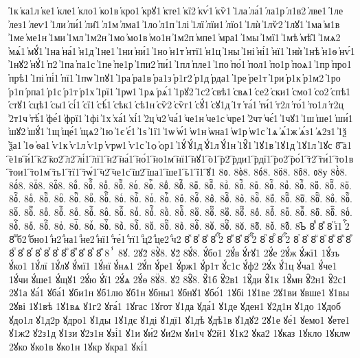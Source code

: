 {҆1к
҆ка1л
҆ке1
҆кле1
҆кло1
҆ко1в
҆кро1
҆крꙋ1
҆кте1
҆кї2
҆кѵ́1
҆кѷ1
҆1ла
҆ла́1
҆ла1р
҆л1в2
҆лве1
҆1ле
҆лез1
҆леѵ1
҆1ли
҆ли́1
҆ли̑1
҆л1м
҆лма1
҆1ло
҆л1п
҆1лі
҆1лї
҆лїи1
҆лїо1
҆1лѝ
҆1лѷ2
҆1лꙋ1
҆1ма
҆м1в
҆1ме
҆ме1н
҆1ми
҆1мл
҆1м2н
҆1мо
҆мо1в
҆мо1н
҆1м2п
҆мпе1
҆мра1
҆1мы
҆1мї1
҆1мѣ
҆мѣ̑1
҆1мѧ2
҆мѧ́1
҆мꙋ́1
҆1на
҆на́1
҆н1д
҆1не1
҆1ни
҆ни́1
҆1но
҆н1т
҆нтї1
҆н1ц
҆1ны
҆1ні
҆ні́1
҆нї1
҆1нѝ
҆1нѣ
҆н1ѳ
҆нѵ́1
҆1нꙋ2
҆нꙋ́1
҆п2
҆1па
҆па1с
҆1пе
҆пе1р
҆1пи2
҆пи́1
҆1пл
҆пле1
҆1по
҆по́1
҆пол1
҆по1р
҆поѧ1
҆1пр
҆про1
҆прѣ1
҆1пі
҆пі́1
҆пї1
҆1пѡ
҆1пꙋ1
҆1ра
҆ра1в
҆ра1з
҆р1г2
҆р1д
҆рда1
҆1ре
҆ре1т
҆1ри
҆р1к
҆р1м2
҆1ро
҆р1п
҆рпа1
҆р1с
҆р1т
҆р1х
҆1рї1
҆1рѡ1
҆1рѧ
҆рѧ́1
҆1рꙋ2
҆1с2
҆свѣ1
҆свѧ1
҆се2
҆ски1
҆смо1
҆со2
҆спѣ1
҆стꙋ1
҆сцѣ1
҆сы1
҆сі́1
҆сї1
҆сѣ́1
҆сѣк1
҆сѣ1н
҆сѷ2
҆сѷг1
҆сꙋ́1
҆сꙋ1д
҆1т
҆та́1
҆ти́1
҆т2л
҆то́1
҆то1л
҆т2ц
҆2т1ч
҆тѣ́1
҆фе́1
҆фрї1
҆1фі
҆1х
҆ха́1
҆хі́1
҆2ц
҆ч2
҆ча́1
҆че1н
҆че1с
҆чре1
҆2чт
҆чє́1
҆1чꙋ1
҆1ш
҆ше1
҆ши́1
҆шꙋ2
҆шꙋ́1
҆1щ
҆ще́1
҆щѧ2
҆1ю
҆1є
҆є́1
҆1ѕ
҆1ї1
҆1ѡ
҆ѡ́1
҆ѡ1н
҆ѡна1
҆ѡ1р
҆ѡ1с
҆1ѧ
҆ѧ́1ж
҆ѧ́з1
҆ѧ2з1
҆1ѯ
҆ѯа1
҆1ѳ
҆ѳа1
҆ѵ1к
҆ѵ1л
҆ѵ1р
҆ѵрѡ1
҆ѵ1с
҆1ѻ
҆ѻр1
҆1ꙋ́
҆ꙋ́1д
҆ꙋ́1л
҆ꙋ́1н
҆1ꙋ̑1
҆1ꙋ1в
҆1ꙋ1д
҆1ꙋ1л
҆1ꙋс
8҇
҇а1
҇е1в
҇и́1
҇к2
҇ко2
҇л2
҇лі́1
҇лї1
҇н2
҇на́1
҇но́1
҇но1м
҇нї1
҇нꙋ1
҇о1
҇р2
҇рди1
҇рдї1
҇ро2
҇ро́1
҇т2
҇ти́1
҇то1в
҇тои1
҇то1м
҇ть1
҇тї1
҇тѡ́1
҇ч2
҇че1с
҇ш2
҇ша1
҇ше1
҇ь1
҇ї1
҇ꙋ1
8ᲂ.
8ᲂ̀8.
8ᲂ́8.
8ᲂ̈8.
8ᲂ̑8.
ᲂ8у  
8ᲂ҆̀8.
8ᲂ҆́8.
8ᲂ҆̈8.
8ᲂ҆̑8.
8ᲂⷠ.
8ᲂⷠ҇.
8ᲂⷡ.
8ᲂⷡ҇.
8ᲂⷢ.
8ᲂⷢ҇.
8ᲂⷣ.
8ᲂⷣ҇.
8ᲂⷤ.
8ᲂⷤ҇.
8ᲂⷥ.
8ᲂⷥ҇.
8ᲂⷦ.
8ᲂⷦ҇.
8ᲂⷧ.
8ᲂⷧ҇.
8ᲂⷨ.
8ᲂⷨ҇.
8ᲂⷩ.
8ᲂⷩ҇.
8ᲂⷪ.
8ᲂⷪ҇.
8ᲂⷫ.
8ᲂⷫ҇.
8ᲂⷬ.
8ᲂⷬ҇.
8ᲂⷭ.
8ᲂⷭ҇.
8ᲂⷮ.
8ᲂⷮ҇.
8ᲂⷯ.
8ᲂⷯ҇.
8ᲂⷰ.
8ᲂⷰ҇.
8ᲂⷱ.
8ᲂⷱ҇.
8ᲂⷲ.
8ᲂⷲ҇.
8ᲂⷳ.
8ᲂⷳ҇.
8ᲂⷴ.
8ᲂⷴ҇.
8ᲂⷵ.
8ᲂⷵ҇.
8ᲂⷶ.
8ᲂⷶ҇.
8ᲂⷷ.
8ᲂⷷ҇.
8ᲂⷸ.
8ᲂⷸ҇.
8ᲂⷹ.
8ᲂⷹ҇.
8ᲂⷺ.
8ᲂⷺ҇.
8ᲂⷻ.
8ᲂⷻ҇.
8ᲂⷼ.
8ᲂⷼ҇.
8ᲂⷽ.
8ᲂⷽ҇.
8ᲂⷾ.
8ᲂⷾ҇.
8ᲂⷿ.
8ᲂⷿ҇.
8ᲂꙴ.
8ᲂꙴ҇.
8ᲂꙵ.
8ᲂꙵ҇.
8ᲂꙶ.
8ᲂꙶ҇.
8ᲂꙷ.
8ᲂꙷ҇.
8ᲂꙸ.
8ᲂꙸ҇.
8ᲂꙹ.
8ᲂꙹ҇.
8ᲂꙺ.
8ᲂꙺ҇.
8ᲂꙻ.
8ᲂꙻ҇.
8ᲂ꙼.
8ᲂ꙼҇.
8ᲂ꙽.
8ᲂ꙽҇.
8ᲆ
8ⷠ
8ⷡ
8ⷢ
ⷢї1
ⷢ҇2
8ⷣ
ⷣб2
ⷣбно1
ⷣн2
ⷣна1
ⷣне2
ⷣнї1
ⷣте́1
ⷣтї1
ⷣц2
ⷣце2
ⷣч2
8ⷤ
8ⷥ
8ⷦ
8ⷧ
ⷧ҇2
8ⷨ
8ⷩ
8ⷪ
ⷪ҇2
8ⷫ
8ⷬ
8ⷭ
ⷭ҇2
8ⷮ
8ⷯ
8ⷰ
8ⷱ
8ⷲ
8ⷳ
8ⷴ
8ⷵ
8ⷶ
8ⷷ
8ⷸ
8ⷹ
8ⷺ
8ⷻ
8ⷼ
8ⷽ
8ⷾ
8ⷿ
8ⸯ
8ꙋ.
2ꙋ2̀
8ꙋ̀8.
ꙋ2́
8ꙋ́8.
ꙋ́бо1
2ꙋ́в
ꙋ́гꙋ1
2ꙋ́е
2ꙋ́ж
ꙋ́жї1
1ꙋ́зъ
ꙋ́ко1
1ꙋ́лї
1ꙋ́лꙋ
ꙋ́мї1
1ꙋ́нї
ꙋ́нѧ1
2ꙋ́п
ꙋ́ре1
ꙋ́рж1
ꙋ́р1т
ꙋ́с1с
ꙋ́ф2
2ꙋ́х
ꙋ́1ц
ꙋ́ча1
ꙋ́че1
1ꙋ́чи
ꙋ́ше1
ꙋ́щꙋ1
2ꙋ́ю
ꙋ́ї1
2ꙋ́ѧ
2ꙋ́ѳ
8ꙋ̈8.
ꙋ2̑
8ꙋ̑8.
ꙋ̑1б
ꙋ̑2в1
1ꙋ̑ди
ꙋ̑1к
1ꙋ̑мн
ꙋ̑2н1
ꙋ̑2с1
2ꙋ1а
ꙋа́1
ꙋба́1
ꙋби1н
ꙋб1лю
ꙋб1н
ꙋбны1
ꙋбнꙋ1
ꙋбо́1
1ꙋбі
1ꙋ1ве
2ꙋ1ви
ꙋвше1
ꙋ1вы
2ꙋві
1ꙋ1вѣ
1ꙋ1вѧ
ꙋ1г2
ꙋга́1
1ꙋгас
1ꙋгот
ꙋ1да
ꙋда́1
ꙋ1де
ꙋден1
ꙋ2д1н
ꙋ1до
1ꙋдоб
ꙋдо1л
ꙋ1д2р
ꙋдро1
ꙋ1ды
1ꙋ1дє
ꙋ1ді
ꙋ1дї1
ꙋ1дѣ
ꙋдѣ1в
ꙋ1дꙋ2
2ꙋ1е
ꙋе́1
ꙋемо1
ꙋете1
ꙋ1ж2
ꙋ2з1д
ꙋ1зи
ꙋ2з1н
ꙋзі́1
ꙋ1и
ꙋи́2
ꙋи2м
ꙋи1ч
ꙋ2й1
ꙋ1к2
ꙋка2
1ꙋказ
1ꙋкло
1ꙋклѡ
2ꙋко
ꙋко1в
ꙋко1н
1ꙋкр
ꙋкра1
ꙋкі́1
}
